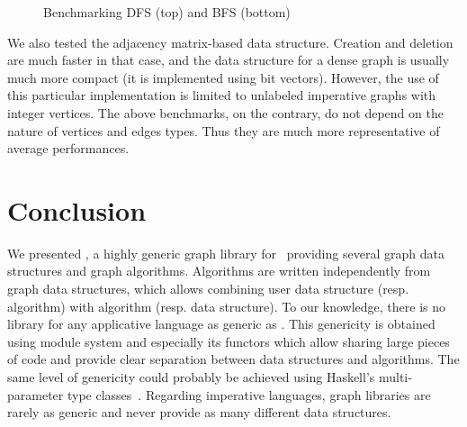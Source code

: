 % 

\begin{figure}
  \centering%
  

  
\vspace*{-1em}
  \caption{Benchmarking DFS (top) and BFS (bottom)}
  \label{XII:fig:bench:maze}
\end{figure}

% 

We also tested the adjacency matrix-based data structure. Creation and
deletion are much faster in that case, and the data structure for
a dense graph is usually much more compact (it is implemented using bit
vectors). However, the use of this particular implementation is
limited to unlabeled imperative graphs with integer vertices. 
The above benchmarks, on the contrary, do not depend on the nature of
vertices and edges types. Thus they are much more representative of
\ocamlgraph average performances.


\section{Conclusion}

We presented \ocamlgraph, a highly generic graph library for \ocaml\
providing several graph data structures and graph algorithms.
Algorithms are written independently from graph data structures, which
allows combining user data structure (resp. algorithm) with
\ocamlgraph algorithm (resp. data structure).  To our knowledge, there
is no library for any applicative language as generic as \ocamlgraph.
This genericity is obtained using \ocaml module system and especially
its functors which allow sharing large pieces of code and provide
clear separation between data structures and algorithms.  The same
level of genericity could probably be achieved using Haskell's
multi-parameter type
classes~\cite{XII:Dreyer2007,XII:Wehr2005,XII:Oleg}.  Regarding
imperative languages, graph libraries are rarely as generic and never
provide as many different data structures.

